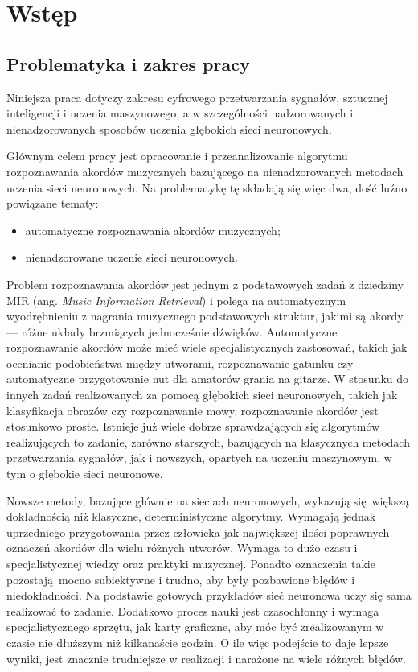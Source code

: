 \chapter{Wstęp} \label{chapter:introduction}



\section{Problematyka i zakres pracy}

Niniejsza praca dotyczy zakresu cyfrowego przetwarzania sygnałów, sztucznej inteligencji i uczenia maszynowego, a w szczególności nadzorowanych i nienadzorowanych sposobów uczenia głębokich sieci neuronowych.

Głównym celem pracy jest opracowanie i przeanalizowanie algorytmu rozpoznawania akordów muzycznych bazującego na nienadzorowanych metodach uczenia sieci neuronowych. Na problematykę tę składają się więc dwa, dość luźno powiązane tematy:
\begin{itemize}
    \item automatyczne rozpoznawania akordów muzycznych;
    \item nienadzorowane uczenie sieci neuronowych.
\end{itemize}

Problem rozpoznawania akordów jest jednym z podstawowych zadań z dziedziny MIR (ang. \emph{Music Information Retrieval}) i polega na automatycznym wyodrębnieniu z nagrania muzycznego podstawowych struktur, jakimi są akordy --- różne układy brzmiących jednocześnie dźwięków. Automatyczne rozpoznawanie akordów może mieć wiele specjalistycznych zastosowań, takich jak ocenianie podobieństwa między utworami, rozpoznawanie gatunku czy automatyczne przygotowanie nut dla amatorów grania na gitarze. W stosunku do innych zadań realizowanych za pomocą głębokich sieci neuronowych, takich jak klasyfikacja obrazów czy rozpoznawanie mowy, rozpoznawanie akordów jest stosunkowo proste. Istnieje już wiele dobrze sprawdzających się algorytmów realizujących to zadanie, zarówno starszych, bazujących na klasycznych metodach przetwarzania sygnałów, jak i nowszych, opartych na uczeniu maszynowym, w tym o głębokie sieci neuronowe. 

Nowsze metody, bazujące głównie na sieciach neuronowych, wykazują się większą dokładnością niż klasyczne, deterministyczne algorytmy. Wymagają jednak uprzedniego przygotowania przez człowieka jak największej ilości poprawnych oznaczeń akordów dla wielu różnych utworów. Wymaga to dużo czasu i specjalistycznej wiedzy oraz praktyki muzycznej. Ponadto oznaczenia takie pozostają mocno subiektywne i trudno, aby były pozbawione błędów i niedokładności.  Na podstawie gotowych przykładów sieć neuronowa uczy się sama realizować to zadanie. Dodatkowo proces nauki jest czasochłonny i wymaga specjalistycznego sprzętu, jak karty graficzne, aby móc być zrealizowanym w czasie nie dłuższym niż kilkanaście godzin. O ile więc podejście to daje lepsze wyniki, jest znacznie trudniejsze w realizacji i narażone na wiele różnych błędów.

